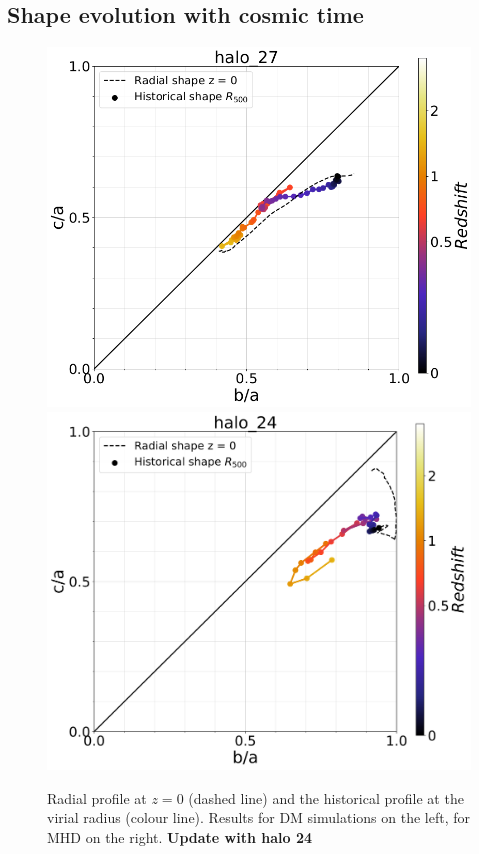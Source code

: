 \documentclass[a4paper,fleqn,usenatbib]{mnras}
\begin{document}
\subsection{Shape evolution with cosmic time}


\begin{figure}
  \includegraphics[width=\columnwidth]{./pics/Redshift/halo_27_DM_Z_correlation.png}
  \includegraphics[width=\columnwidth]{./pics/Redshift/halo_24_level3_MHD_Z_Triax.png}
  \caption{Radial profile at $z=0$ (dashed line) and 
    the historical profile at the virial radius (colour line). 
    Results for DM simulations on the left, for MHD on the right.{\bf
      Update with halo 24}}
  \label{fig:redshift_triaxial}
\end{figure}
\end{document}
